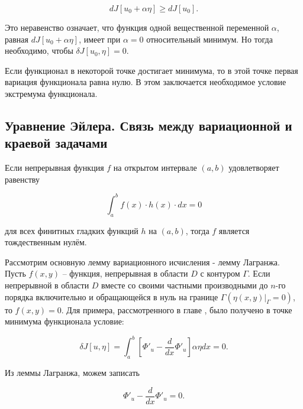 \documentclass{article}
\begin{document}
\begin{equation}
     dJ[u_{0} + \alpha\eta] \geq dJ[u_{0}].
\end{equation}

\noindent Это неравенство означает, что функция одной вещественной переменной $\alpha$, равная $dJ[u_{0} + \alpha\eta]$, имеет при $\alpha = 0$ относительный минимум. Но тогда необходимо, чтобы  $\delta J[u_{0}, \eta] = 0$.

\begin{warn}[Важно!]
	Если функционал в некоторой точке достигает минимума, то в этой точке первая вариация функционала равна нулю. В этом заключается необходимое условие экстремума функционала.
\end{warn}

\subsection{Уравнение Эйлера. Связь между вариационной и краевой задачами}

\begin{warn}
	Если непрерывная функция $f$ на открытом интервале $(a, b)$ удовлетворяет равенству
	
\begin{displaymath}
	\int_{a}^{b} f(x) \cdot h(x) \cdot dx = 0
\end{displaymath}

\noindent для всех финитных гладких функций $h$ на $(a, b)$, тогда $f$ является тождественным нулём.


\end{warn}

Рассмотрим основную лемму вариационного исчисления - лемму Лагранжа. Пусть $f(x, y)$ – функция, непрерывная в области $D$ с контуром $\Gamma$. Если непрерывной в области $D$ вместе со своими частными производными до $n$-го порядка включительно и обращающейся в нуль на границе $\Gamma(\eta(x, y)|_{\Gamma}  = 0)$, то $f(x, y) = 0$.
Для примера, рассмотренного в главе \label{sub_section_minimum_conditions}, было получено в точке минимума функционала условие:

\begin{equation}
	\delta J[u, \eta] = \int_{a}^{b} [\Phi'_{u} - \frac{d}{dx}\Phi'_{u}] \alpha \eta dx = 0.
\end{equation}

\noindent Из леммы Лагранжа, можем записать

\begin{equation}\label{euler_equation}
	\Phi'_{u} - \frac{d}{dx}\Phi'_{u} = 0.
\end{equation}
\end{document}
